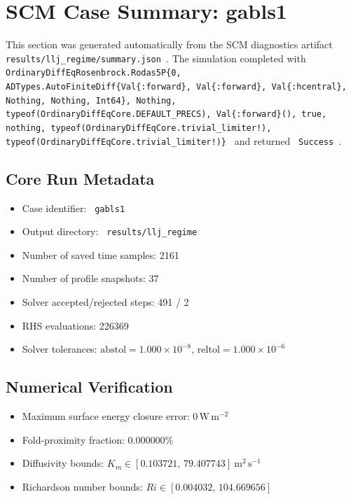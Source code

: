 \section{SCM Case Summary: gabls1}
\label{sec:scm_case_llj_regime_scm_case_report}

This section was generated automatically from the SCM diagnostics artifact
\texttt{ results/llj\_regime/summary.json }. The simulation completed with \texttt{ OrdinaryDiffEqRosenbrock.Rodas5P\{0, ADTypes.AutoFiniteDiff\{Val\{:forward\}, Val\{:forward\}, Val\{:hcentral\}, Nothing, Nothing, Int64\}, Nothing, typeof(OrdinaryDiffEqCore.DEFAULT\_PRECS), Val\{:forward\}(), true, nothing, typeof(OrdinaryDiffEqCore.trivial\_limiter!), typeof(OrdinaryDiffEqCore.trivial\_limiter!)\} }
and returned \texttt{ Success }.

\subsection{Core Run Metadata}
\begin{itemize}
  \item Case identifier: \texttt{ gabls1 }
  \item Output directory: \texttt{ results/llj\_regime }
  \item Number of saved time samples: 2161
  \item Number of profile snapshots: 37
  \item Solver accepted/rejected steps: 491 / 2
  \item RHS evaluations: 226369
  \item Solver tolerances: $\mathrm{abstol}=1.000 \times 10^{-8}$, $\mathrm{reltol}=1.000 \times 10^{-6}$
\end{itemize}

\subsection{Numerical Verification}
\begin{itemize}
  \item Maximum surface energy closure error:
  $0\,\mathrm{W\,m^{-2}}$
  \item Fold-proximity fraction:
  $0.000000\%$
  \item Diffusivity bounds:
  $K_m \in [0.103721,\,79.407743]~\mathrm{m^2\,s^{-1}}$
  \item Richardson number bounds:
  $Ri \in [0.004032,\,104.669656]$
\end{itemize}

